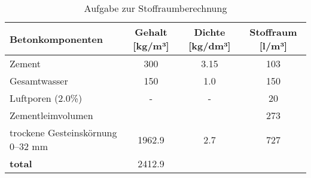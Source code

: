 \begin{questions}
\begin{solution}
\begin{table}[H]
                \caption{Aufgabe zur Stoffraumberechnung}
                \begin{tabularx}{\textwidth}{Xccc}
                \toprule
                \textbf{Betonkomponenten}       & \textbf{Gehalt [kg/m³]} & \textbf{Dichte [kg/dm³]} & \textbf{Stoffraum [l/m³]} \\ 
                \midrule
                Zement                           & 300                      & 3.15                       &    103          \\
                Gesamtwasser                     & 150                      & 1.0                       & 150            \\
                Luftporen (2.0\%)                & -                        & -                         & 20              \\
                Zementleimvolumen                &                          &                           &  273                         \\
                trockene Gesteinskörnung 0–32 mm & 1962.9                    & 2.7                       & 727            \\
                \textbf{total}                   & 2412.9           &            {}               & {}             \\
                \bottomrule
            \end{tabularx}
            \label{tab:Stoffraumberechnung2}
                \end{table}
            
        \end{solution}

\end{questions}





